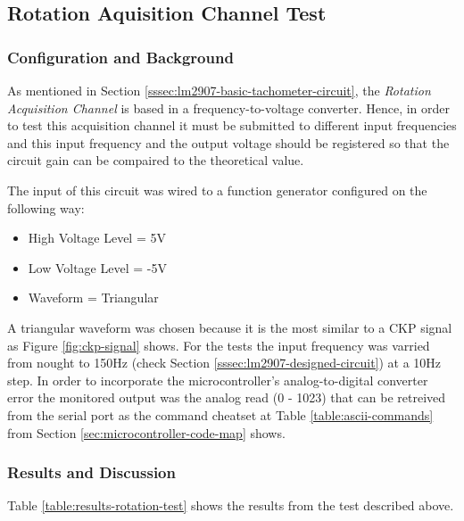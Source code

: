 \subsection{Rotation Aquisition Channel Test}\label{sec:speed-aquisition-channel-test}
	
	\subsubsection{Configuration and Background}

		As mentioned in Section \ref{sssec:lm2907-basic-tachometer-circuit}, the \textit{Rotation Acquisition Channel} is based in a frequency-to-voltage converter. Hence, in order to test this acquisition channel it must be submitted to different input frequencies and this input frequency and the output voltage should be registered so that the circuit gain can be compaired to the theoretical value.
		\par
		The input of this circuit was wired to a function generator configured on the following way:

			\begin{itemize}
				\item High Voltage Level = 5V
				\item Low Voltage Level = -5V
				\item Waveform = Triangular
			\end{itemize}
		A triangular waveform was chosen because it is the most similar to a CKP signal as Figure \ref{fig:ckp-signal} shows. For the tests the input frequency was varried from nought to 150Hz (check Section \ref{sssec:lm2907-designed-circuit}) at a 10Hz step. In order to incorporate the microcontroller's analog-to-digital converter error the monitored output was the analog read (0 - 1023) that can be retreived from the serial port as the command cheatset at Table \ref{table:ascii-commands} from Section \ref{sec:microcontroller-code-map} shows.

	\subsubsection{Results and Discussion}

		Table \ref{table:results-rotation-test} shows the results from the test described above.

